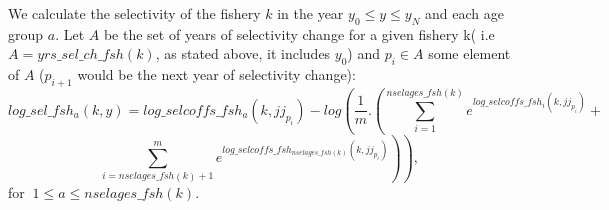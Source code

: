 \documentclass{article}
\begin{document}
\begin{itemize}



We calculate the selectivity of the fishery $k$ in the year $y_0\leq y \leq y_N$ and each age group $a$. Let $A$ be the set of years of selectivity change for a given fishery k( i.e $A= yrs\_sel\_ch\_fsh(k)$, as stated above, it includes $y_0$) and $p_i\in A$  some element of $A$ ($p_{i+1}$ would be the next year of selectivity change):
 \begin{equation}
        log\_sel\_fsh_a(k,y)=log\_selcoffs\_fsh_a(k,jj_{p_i})-log\left(\dfrac{1}{m}.\left(\sum_{i=1}^{nselages\_fsh(k)}e^{log\_selcoffs\_fsh_i(k,jj_{p_i})}+\right.\right.
    \end{equation}
    \begin{equation*}
       \left. \left.\sum_{i=nselages\_fsh(k)+1}^{m}e^{log\_selcoffs\_fsh_{nselages\_fsh(k)}(k,jj_{p_i})}\right)\right), 
    \end{equation*}
   for $\ 1\leq a \leq nselages\_fsh(k)$.\\
   

\end{itemize}
\end{document}
